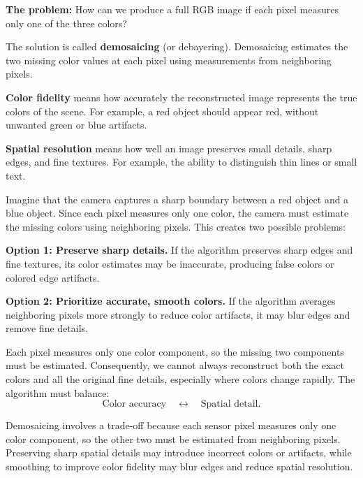 {\textbf{The problem:} How can we produce a full RGB image if each pixel measures
only one of the three colors?

The solution is called \textbf{demosaicing} (or debayering).
Demosaicing estimates the two missing color values at each pixel using
measurements from neighboring pixels.

\textbf{Color fidelity} means how accurately the reconstructed image represents
the true colors of the scene.
For example, a red object should appear red, without unwanted green or blue
artifacts.

\textbf{Spatial resolution} means how well an image preserves small details,
sharp edges, and fine textures.
For example, the ability to distinguish thin lines or small text.

Imagine that the camera captures a sharp boundary between a red object and a
blue object.
Since each pixel measures only one color, the camera must estimate the missing
colors using neighboring pixels.
This creates two possible problems:

\textbf{Option 1: Preserve sharp details.}
If the algorithm preserves sharp edges and fine textures, its color estimates
may be inaccurate, producing false colors or colored edge artifacts.

\textbf{Option 2: Prioritize accurate, smooth colors.}
If the algorithm averages neighboring pixels more strongly to reduce color
artifacts, it may blur edges and remove fine details.

Each pixel measures only one color component, so the missing two components
must be estimated.
Consequently, we cannot always reconstruct both the exact colors and all the
original fine details, especially where colors change rapidly.
The algorithm must balance:
\[
\text{Color accuracy}\quad\longleftrightarrow\quad\text{Spatial detail}.
\]

Demosaicing involves a trade-off because each sensor pixel measures only one
color component, so the other two must be estimated from neighboring pixels.
Preserving sharp spatial details may introduce incorrect colors or artifacts,
while smoothing to improve color fidelity may blur edges and reduce spatial
resolution.
}

